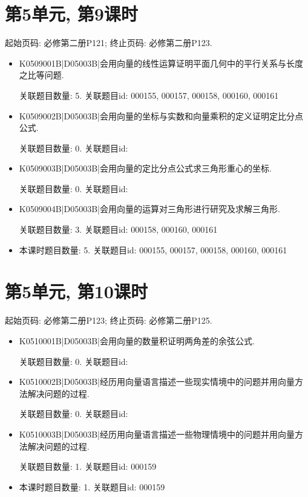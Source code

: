 \section*{第5单元, 第9课时}
起始页码: 必修第二册P121; 终止页码: 必修第二册P123.
\begin{itemize}
\item K0509001B|D05003B|会用向量的线性运算证明平面几何中的平行关系与长度之比等问题.

关联题目数量: 5. 关联题目id: 000155, 000157, 000158, 000160, 000161

\item K0509002B|D05003B|会用向量的坐标与实数和向量乘积的定义证明定比分点公式.

关联题目数量: 0. 关联题目id: 

\item K0509003B|D05003B|会用向量的定比分点公式求三角形重心的坐标.

关联题目数量: 0. 关联题目id: 

\item K0509004B|D05003B|会用向量的运算对三角形进行研究及求解三角形.

关联题目数量: 3. 关联题目id: 000158, 000160, 000161

\item 本课时题目数量: 5. 关联题目id: 000155, 000157, 000158, 000160, 000161

\end{itemize}

\section*{第5单元, 第10课时}
起始页码: 必修第二册P123; 终止页码: 必修第二册P125.
\begin{itemize}
\item K0510001B|D05003B|会用向量的数量积证明两角差的余弦公式.

关联题目数量: 0. 关联题目id: 

\item K0510002B|D05003B|经历用向量语言描述一些现实情境中的问题并用向量方法解决问题的过程.

关联题目数量: 0. 关联题目id: 

\item K0510003B|D05003B|经历用向量语言描述一些物理情境中的问题并用向量方法解决问题的过程.

关联题目数量: 1. 关联题目id: 000159

\item 本课时题目数量: 1. 关联题目id: 000159

\end{itemize}

